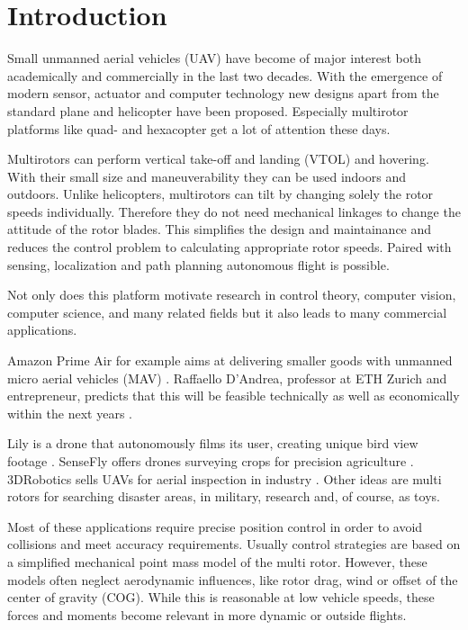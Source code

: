 \chapter{Introduction}
\label{sec:introduction}

 Small unmanned aerial vehicles (UAV) have become of major interest both academically and commercially in the last two decades. With the emergence of modern sensor, actuator and computer technology new designs apart from the standard plane and helicopter have been proposed.  Especially multirotor platforms like quad- and hexacopter get a lot of attention these days.

 Multirotors can perform vertical take-off and landing (VTOL) and hovering. With their small size and maneuverability they can be used indoors and outdoors. Unlike helicopters, multirotors can tilt by changing solely the rotor speeds individually. Therefore they do not need mechanical linkages to change the attitude of the rotor blades. This simplifies the design and maintainance and reduces the control problem to calculating appropriate rotor speeds. Paired with sensing, localization and path planning autonomous flight is possible. 

 Not only does this platform motivate research in control theory, computer vision, computer science, and many related fields but it also leads to many commercial applications. 

Amazon Prime Air for example aims at delivering smaller goods with unmanned micro aerial vehicles (MAV) \cite{www:primeair}. Raffaello D'Andrea, professor at ETH Zurich and entrepreneur, predicts that this will be feasible technically as well as economically within the next years \cite{DAndrea2014}. 

Lily is a drone that autonomously films its user, creating unique bird view footage \cite{www:lily}. SenseFly offers drones surveying crops for precision agriculture \cite{www:sensefly}. 3DRobotics sells UAVs for aerial inspection in industry \cite{www:3drobotics}. Other ideas are multi rotors for searching disaster areas, in military, research and, of course, as toys.

Most of these applications require precise position control in order to avoid collisions and meet accuracy requirements. Usually control strategies are based on a simplified mechanical point mass model of the multi rotor. However, these models often neglect aerodynamic influences, like rotor drag, wind or offset of the center of gravity (COG). While this is reasonable at low vehicle speeds, these forces and moments become relevant in more dynamic or outside flights.

